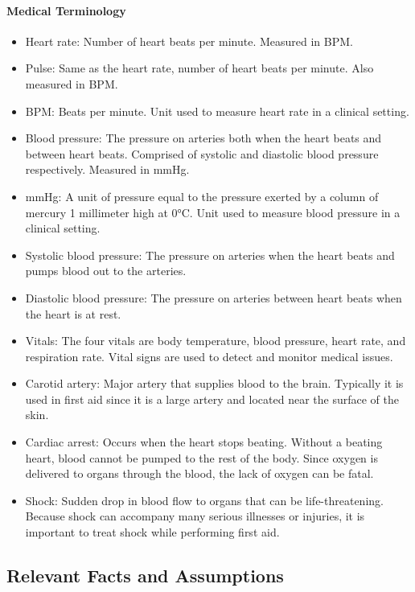 \documentclass{article}
\begin{document}
	\paragraph{Medical Terminology}
	\begin{itemize}
	    \item Heart rate:  Number of heart beats per minute.  Measured in BPM.
	    \item Pulse:  Same as the heart rate, number of heart beats per minute.  Also measured in BPM.
	    \item BPM:  Beats per minute.  Unit used to measure heart rate in a clinical setting.
	    \item Blood pressure:  The pressure on arteries both when the heart beats and between heart beats.  Comprised of systolic and diastolic blood pressure respectively.  Measured in mmHg.
	    \item mmHg: A unit of pressure equal to the pressure exerted by a column of mercury 1 millimeter high at 0°C.  Unit used to measure blood pressure in a clinical setting. 
	    \item Systolic blood pressure:  The pressure on arteries when the heart beats and pumps blood out to the arteries.
	    \item Diastolic blood pressure:  The pressure on arteries between heart beats when the heart is at rest.
	    \item Vitals: The four vitals are body temperature, blood pressure, heart rate, and respiration rate. Vital signs are used to detect and monitor medical issues. 
	    \item Carotid artery: Major artery that supplies blood to the brain. Typically it is used in first aid since it is a large artery and located near the surface of the skin.
	    \item Cardiac arrest: Occurs when the heart stops beating.  Without a beating heart, blood cannot be pumped to the rest of the body.  Since oxygen is delivered to organs through the blood, the lack of oxygen can be fatal. 
	    \item Shock: Sudden drop in blood flow to organs that can be life-threatening. Because shock can accompany many serious illnesses or injuries, it is important to treat shock while performing first aid.


	\end{itemize}
	\newpage
	\subsection{Relevant Facts and Assumptions}
	
\end{document}
